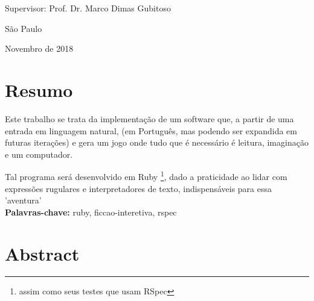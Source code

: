 \documentclass[12pt,twoside,a4paper]{book}
\begin{document}
    \vskip 5cm

    \begin{center}
        Supervisor: Prof. Dr. Marco Dimas Gubitoso

        \vskip 5cm
        \normalsize{São Paulo}

        \normalsize{Novembro de 2018}
    \end{center}
    \pagebreak








    \chapter*{Resumo}

    Este trabalho se trata da implementação de um software que, a partir de uma entrada em linguagem
    natural, (em Português, mas podendo ser expandida em futuras iterações) e gera um jogo onde
    tudo que é necessário é leitura, imaginação e um computador.

    Tal programa será desenvolvido em Ruby \footnote{assim como seus testes que usam RSpec}, dado a
    praticidade ao lidar com expressões rugulares e interpretadores de texto, indispensáveis para
    essa 'aventura'
    \\

    \noindent \textbf{Palavras-chave:} ruby, ficcao-interetiva, rspec

    \chapter*{Abstract}
\end{document}
